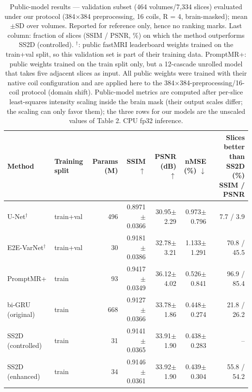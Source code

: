 \begin{table}[ht]
\centering
\caption{Public-model results — validation subset (464 volumes/7,334 slices) evaluated under our protocol (384×384 preprocessing, 16 coils, R = 4, brain-masked); mean$\pm$SD over volumes. Reported for reference only, hence no ranking marks. Last column: fraction of slices (SSIM / PSNR, \%) on which the method outperforms SS2D (controlled). $^\dagger$: public fastMRI leaderboard weights trained on the train+val split, so this validation set is part of their training data. PromptMR+: public weights trained on the train split only, but a 12-cascade unrolled model that takes five adjacent slices as input. All public weights were trained with their native coil configuration and are applied here to the 384×384-preprocessing/16-coil protocol (domain shift). Public-model metrics are computed after per-slice least-squares intensity scaling inside the brain mask (their output scales differ; the scaling can only favor them); the three rows for our models are the unscaled values of Table 2. CPU fp32 inference.}
\label{tab:reference}
\begin{tabular}{llrrrrr}
\toprule
Method & Training split & Params (M) & SSIM $\uparrow$ & PSNR (dB) $\uparrow$ & nMSE (\%) $\downarrow$ & Slices better than SS2D (\%) SSIM / PSNR \\
\midrule
U-Net$^\dagger$ & train+val & 496 & 0.8971$\pm$0.0366 & 30.95$\pm$2.29 & 0.973$\pm$0.796 & 7.7 / 3.9 \\
E2E-VarNet$^\dagger$ & train+val & 30 & 0.9181$\pm$0.0386 & 32.78$\pm$3.21 & 1.133$\pm$1.291 & 70.8 / 45.5 \\
PromptMR+ & train & 93 & 0.9417$\pm$0.0349 & 36.12$\pm$4.02 & 0.526$\pm$0.841 & 96.9 / 85.4 \\
bi-GRU (original) & train & 668 & 0.9127$\pm$0.0366 & 33.78$\pm$1.86 & 0.448$\pm$0.274 & 21.8 / 26.2 \\
SS2D (controlled) & train & 31 & 0.9141$\pm$0.0365 & 33.91$\pm$1.90 & 0.438$\pm$0.283 & -- \\
SS2D (enhanced) & train & 34 & 0.9146$\pm$0.0361 & 33.92$\pm$1.90 & 0.439$\pm$0.304 & 55.8 / 54.2 \\
\bottomrule
\end{tabular}
\end{table}
